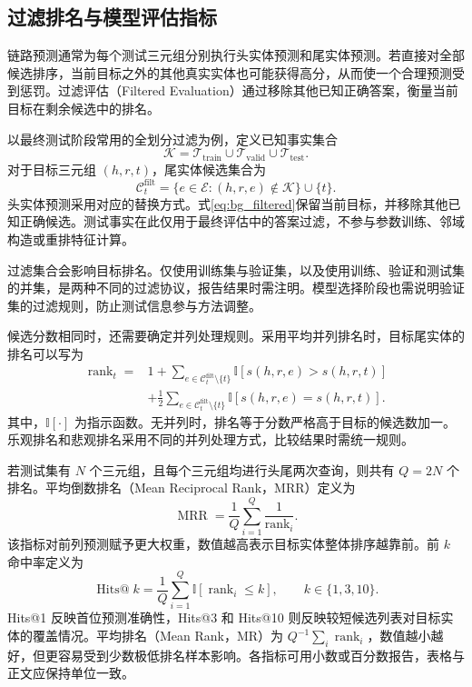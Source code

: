 \subsection{过滤排名与模型评估指标}

链路预测通常为每个测试三元组分别执行头实体预测和尾实体预测。若直接对全部候选排序，当前目标之外的其他真实实体也可能获得高分，从而使一个合理预测受到惩罚。过滤评估（Filtered Evaluation）通过移除其他已知正确答案，衡量当前目标在剩余候选中的排名\cite{bordes2013translating}。

以最终测试阶段常用的全划分过滤为例，定义已知事实集合
\begin{equation}
    \mathcal{K}=\mathcal{T}_{\mathrm{train}}
      \cup\mathcal{T}_{\mathrm{valid}}\cup\mathcal{T}_{\mathrm{test}}.
\end{equation}
对于目标三元组 $(h,r,t)$，尾实体候选集合为
\begin{equation}
    \mathcal{C}^{\mathrm{filt}}_t
    =\{e\in\mathcal{E}:(h,r,e)\notin\mathcal{K}\}\cup\{t\}.
    \label{eq:bg_filtered}
\end{equation}
头实体预测采用对应的替换方式。式\eqref{eq:bg_filtered}保留当前目标，并移除其他已知正确候选。测试事实在此仅用于最终评估中的答案过滤，不参与参数训练、邻域构造或重排特征计算。

过滤集合会影响目标排名。仅使用训练集与验证集，以及使用训练、验证和测试集的并集，是两种不同的过滤协议，报告结果时需注明。模型选择阶段也需说明验证集的过滤规则，防止测试信息参与方法调整。

候选分数相同时，还需要确定并列处理规则。采用平均并列排名时，目标尾实体的排名可以写为
\begin{equation}
\begin{aligned}
    \operatorname{rank}_t={}&1+
    \sum_{e\in\mathcal{C}^{\mathrm{filt}}_t\setminus\{t\}}
       \mathbb{I}[s(h,r,e)>s(h,r,t)]\\
    &+\frac{1}{2}
    \sum_{e\in\mathcal{C}^{\mathrm{filt}}_t\setminus\{t\}}
       \mathbb{I}[s(h,r,e)=s(h,r,t)].
\end{aligned}
    \label{eq:bg_rank}
\end{equation}
其中，$\mathbb{I}[\cdot]$ 为指示函数。无并列时，排名等于分数严格高于目标的候选数加一。乐观排名和悲观排名采用不同的并列处理方式，比较结果时需统一规则。

若测试集有 $N$ 个三元组，且每个三元组均进行头尾两次查询，则共有 $Q=2N$ 个排名。平均倒数排名（Mean Reciprocal Rank，MRR）定义为
\begin{equation}
    \operatorname{MRR}=\frac{1}{Q}\sum_{i=1}^{Q}
       \frac{1}{\operatorname{rank}_i}.
    \label{eq:bg_mrr}
\end{equation}
该指标对前列预测赋予更大权重，数值越高表示目标实体整体排序越靠前。前 $k$ 命中率定义为
\begin{equation}
    \operatorname{Hits@}k=\frac{1}{Q}\sum_{i=1}^{Q}
       \mathbb{I}[\operatorname{rank}_i\leq k],
    \qquad k\in\{1,3,10\}.
    \label{eq:bg_hits}
\end{equation}
Hits@1 反映首位预测准确性，Hits@3 和 Hits@10 则反映较短候选列表对目标实体的覆盖情况。平均排名（Mean Rank，MR）为 $Q^{-1}\sum_i\operatorname{rank}_i$，数值越小越好，但更容易受到少数极低排名样本影响。各指标可用小数或百分数报告，表格与正文应保持单位一致。

